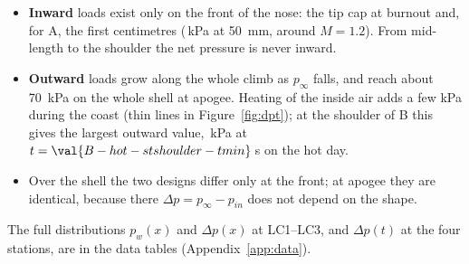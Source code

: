 \begin{itemize}
\item \textbf{Inward} loads exist only on the front of the nose: the tip cap at burnout and, for A,
the first centimetres (\,kPa at \SI{50}{mm}, around $M = 1.2$). From mid-length
to the shoulder the net pressure is never inward.
\item \textbf{Outward} loads grow along the whole climb as $p_\infty$ falls, and reach about
\SI{70}{kPa} on the whole shell at apogee. Heating of the inside air adds a few kPa during the coast
(thin lines in Figure~\ref{fig:dpt}); at the shoulder of B this gives the largest outward value,
\,kPa at $t = \val{B-hot-stshoulder-tmin}$\,s on the hot day.
\item Over the shell the two designs differ only at the front; at apogee they are identical, because
there $\Delta p = p_\infty - p_{in}$ does not depend on the shape.
\end{itemize}
The full distributions $p_w(x)$ and $\Delta p(x)$ at LC1--LC3, and $\Delta p(t)$ at the four stations,
are in the data tables (Appendix~\ref{app:data}).
